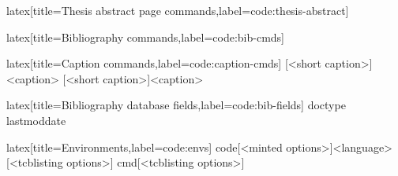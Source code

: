 %
\begin{code}[firstnumber=last]{latex}[title={Thesis abstract page commands},label=code:thesis-abstract]
\makethesisabstract
\end{code}
%
\begin{code}[firstnumber=last]{latex}[title={Bibliography commands},label=code:bib-cmds]
\makebibliography[<options>]
\end{code}
%
\begin{code}[firstnumber=last]{latex}[title={Caption commands},label=code:caption-cmds]
[<short caption>]{<caption>}
[<short caption>]{<caption>}
\end{code}
%
\begin{code}[firstnumber=last]{latex}[title={Bibliography database fields},label=code:bib-fields]
doctype
lastmoddate
\end{code}
%
\begin{code}[firstnumber=last]{latex}[title={Environments},label=code:envs]
{code}[<minted options>]{<language>}[<tcblisting options>]
{cmd}[<tcblisting options>]
\end{code}

